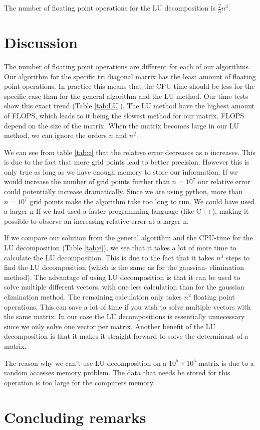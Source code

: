 \documentclass[norsk,a4paper,12pt]{article}
\begin{document}
The number of floating point operations for the LU decomposition is $\frac{2}{3} n^3$.

\section{Discussion}

The number of floating point operations are different for each of our algorithms. Our algorithm for the specific tri diagonal matrix has the least amount of floating point operations. In practice this means that the CPU time should be less for the specific case than for the general algorithm and the LU method. Our time tests show this exact trend (Table \ref{tab:LU}). The LU method have the highest amount of FLOPS, which leads to it being the slowest method for our matrix. FLOPS depend on the size of the matrix. When the matrix becomes large in our LU method, we can ignore the orders $n$ and $n^2$.     

We can see from table \ref{tab:e} that the relative error decreases as n increases. This is due to the fact that more grid points lead to better precision. However this is only true as long as we have enough memory to store our information. If we would increase the number of grid points further than $n=10^7$ our relative error could potentially increase dramatically. Since we are using python, more than $n=10^7$ grid points make the algorithm take too long to run. We could have used a larger n If we had used a faster programming language (like C++), making it possible to observe an increasing relative error at a larger n.

If we compare our solution from the general algorithm and the CPU-time for the LU decomposition (Table \ref{tab:e}), we see that it takes a lot of more time to calculate the LU decomposition. This is due to the fact that it takes $n^3$ steps to find the LU decomposition (which is the same as for the gaussian- elimination method). The advantage of using LU decomposition is that it can be used to solve multiple different vectors, with one less calculation than for the gaussian elimination method. The remaining calculation only takes $n^2$ floating point operations. This can save a lot of time if you wish to solve multiple vectors with the same matrix. In our case the LU decompositions is essentially unnecessary since we only solve one vector per matrix. Another benefit of the LU decomposition is that it makes it straight forward to solve the determinant of a matrix.

The reason why we can’t use LU decomposition on a $10^5 \times 10^5$ matrix is due to a random accesses memory problem. The data that needs be stored for this operation is too large for the computers memory. 

\section{Concluding remarks}


\end{document}
